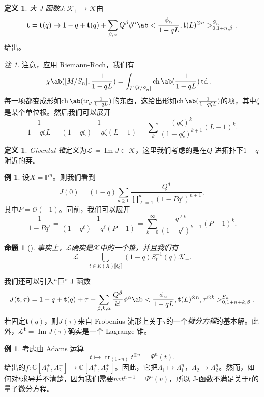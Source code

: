 \documentclass{amsart}
\newtheorem{prop}[thm]{命题}
\theoremstyle{definition}
\newtheorem{defn}[thm]{定义}
\newtheorem{exm}[thm]{例}
\theoremstyle{remark}
\newtheorem{rmk}[thm]{注}
\theoremstyle{plain}
\theoremstyle{definition}
\theoremstyle{remark}
\DeclareMathOperator{\Ima}{Im}
\newcommand{\C}{\mathbb{C}}
\renewcommand{\P}{\mathbb{P}}
\newcommand{\mc}[1]{\mathcal{#1}}
\newcommand{\on}[1]{\operatorname{#1}}
\newcommand{\1}{\mathbf{1}}
\newcommand{\2}{\mathbf{2}}
\newcommand{\3}{\mathbf{3}}
\newcommand{\ps}[1]{\llbracket #1 \rrbracket}
\begin{document}
\begin{defn}
    \textit{大 J-函数}\(J \colon \mc{K}_+ \to \mc{K}\)由
    \[ \mathbf{t} = \mathbf{t}(q) \mapsto 1 - q + \mathbf{t}(q) + \sum_{\beta, \alpha} Q^{\beta} \phi^{\alpha} \ab< \frac{\phi_{\alpha}}{1-qL}, \mathbf{t}(L)^{\otimes n}>_{0, 1+n, \beta}^{S_n}. \]
    给出。
\end{defn}

\begin{rmk}
    注意，应用 Riemann-Roch，我们有
    \begin{align*}
        \chi\ab([\bar{M}/S_n], \frac{1}{1-qL}) &= \int_{I[\bar{M}/S_n]} \on{ch}\ab(\frac{1}{1-qL}) \on{td}.
    \end{align*}
    每一项都变成形如\(\on{ch}\ab(\on{tr}_g \frac{1}{1-qL})\)的东西，这给出形如\(\on{ch}\ab(\frac{1}{1-q\zeta L})\)的项，其中\(\zeta\)是某个单位根。然后我们可以展开
    \[ \frac{1}{1-q\zeta L} = \frac{1}{(1-q \zeta) - q\zeta (L-1)} = \sum_k \frac{(q\zeta)^k}{(1-q\zeta)^{k+1}}(L-1)^k. \]
\end{rmk}

\begin{defn}
    \textit{Givental 锥}定义为\(\mc{L} \coloneqq \Ima J \subset \mc{K}\)，这里我们考虑的是在\(Q\)-进拓扑下\(1-q\)附近的芽。
\end{defn}

\begin{exm}
    设\(X = \P^n\)。则我们看到
    \[ J(0) = (1-q) \sum_{d \geq 0} \frac{Q^d}{\prod_{\ell=1}^d (1-Pq^{\ell})^{n+1}}, \]
    其中\(P = \mc{O}(-1)\)。同前，我们可以展开
    \[ \frac{1}{1-P q^{\ell}} = \frac{1}{(1-q^{\ell}) - q^{\ell}(P-1)} = \sum_{k=0}^{\infty} \frac{q^{\ell k}}{(1-q^{\ell})^{k+1}}(P-1)^k. \]
\end{exm}

\begin{prop}[{\cite{GiventalK7}}]
    事实上，\(\mc{L}\)确实是\(\mc{K}\)中的一个锥，并且我们有
    \[ \mc{L} = \bigcup_{t \in K(X)\ps{Q}} (1-q) S_{t}^{-1}(q) \mc{K}_+. \]
\end{prop}

我们还可以引入“巨” J-函数
\[ J(\mathbf{t}, \tau) = 1-q + \mathbf{t}(q) + \tau + \sum_{\beta, k, \alpha} \frac{Q^{\beta}}{k!} \phi^{\alpha} \ab< \frac{\phi_{\alpha}}{1-qL}, \mathbf{t}(L)^{\otimes n}, \tau^{\otimes k}>_{0,1+n+k,\beta}^{S_n}. \]
若固定\(\mathbf{t}(q)\)，则\(J(\tau)\)来自 Frobenius 流形上关于\(\tau\)的一个\textit{微分方程}的基本解。此外，\(\mc{L}^{\mathbf{t}}=  \Ima J(\tau)\)确实是一个 Lagrange 锥。

\begin{exm}
    考虑由 Adams 运算
    \[ t \mapsto \on{tr}_{(1\cdots n)} t^{\otimes n} = \Psi^n (t). \]
    给出的\(f \colon \C[\Lambda_1^{\pm}, \Lambda_2^{\pm}] \to \C[\Lambda_1^{\pm}, \Lambda_2^{\pm}]\)。因此，它把\(\Lambda_1 \mapsto \Lambda_1^n\)，\(\Lambda_2 \mapsto \Lambda_2^n\)。然而，如何对\(t\)求导并不清楚，因为我们需要\(nv t^{n-1} = \Psi^n(v)\)，所以 J-函数不满足关于\(\mathbf{t}\)的量子微分方程。
\end{exm}
\end{document}
